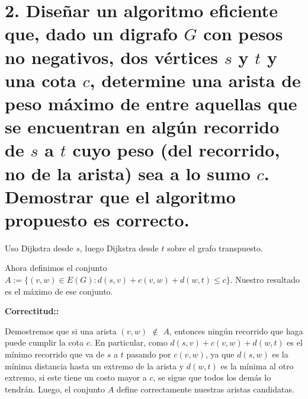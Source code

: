 \documentclass{article}
\begin{document}
\section*{2. Diseñar un algoritmo eficiente que, dado un digrafo \( G \) con pesos no negativos, dos vértices \( s \) y \( t \) y una cota \( c \), determine una arista de peso máximo de entre aquellas que se encuentran en algún recorrido de \( s \) a \( t \) cuyo peso (del recorrido, no de la arista) sea a lo sumo \( c \). Demostrar que el algoritmo propuesto es correcto.}

Uso Dijkstra desde \( s \), luego Dijkstra desde \( t \) sobre el grafo transpuesto.

Ahora definimos el conjunto \( A := \{(v,w) \in E(G) : d(s,v) + c(v,w) + d(w,t) \leq c\} \). Nuestro resultado es el máximo de ese conjunto.

\textbf{Correctitud::}

Demostremos que si una arista \( (v,w) \) $\notin$ \( A \), entonces ningún recorrido que haga puede cumplir la cota \( c \). En particular, como \( d(s,v) + c(v,w) + d(w,t) \) es el mínimo recorrido que va de \( s \) a \( t \) pasando por \( c(v,w) \), ya que \( d(s,w) \) es la mínima distancia hasta un extremo de la arista y \( d(w,t) \) es la mínima al otro extremo, si este tiene un costo mayor a \( c \), se sigue que todos los demás lo tendrán. Luego, el conjunto \( A \) define correctamente nuestras aristas candidatas.
\end{document}
